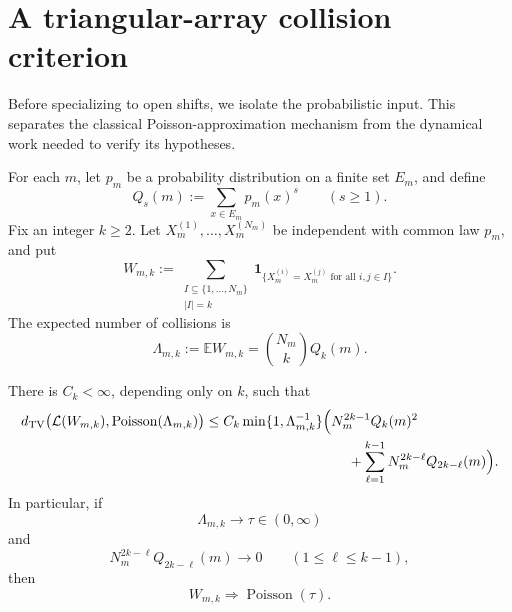 \section{A triangular-array collision criterion}
\label{sec:triangular-array}

Before specializing to open shifts, we isolate the probabilistic input.
This separates the classical Poisson-approximation mechanism from the
dynamical work needed to verify its hypotheses.

For each \(m\), let \(p_m\) be a probability distribution on a finite
set \(E_m\), and define
\[
  Q_s(m):=\sum_{x\in E_m}p_m(x)^s
  \qquad(s\geq1).
\]
Fix an integer \(k\geq2\).  Let
\(X_m^{(1)},\ldots,X_m^{(N_m)}\) be independent with common law \(p_m\),
and put
\[
  W_{m,k}
  :=\sum_{\substack{I\subseteq\{1,\ldots,N_m\}\\|I|=k}}
     \mathbf1_{\{X_m^{(i)}=X_m^{(j)}\text{ for all }i,j\in I\}}.
\]
The expected number of collisions is
\[
  \Lambda_{m,k}:=\mathbb EW_{m,k}
  =\binom{N_m}{k}Q_k(m).
\]

\begin{theorem}
\label{thm:abstract-collision-criterion}
There is \(C_k<\infty\), depending only on \(k\), such that
\begin{align}
 d_{\rm TV}\bigl(\mathcal L(W_{m,k}),
   \operatorname{Poisson}(\Lambda_{m,k})\bigr)
 &\leq C_k\min\{1,\Lambda_{m,k}^{-1}\}
 \Bigl(
 N_m^{2k-1}Q_k(m)^2 \notag\\
 &\hspace{36mm}+
 \sum_{\ell=1}^{k-1}N_m^{2k-\ell}Q_{2k-\ell}(m)
 \Bigr).
 \label{eq:abstract-tv-bound}
\end{align}
In particular, if
\[
  \Lambda_{m,k}\longrightarrow\tau\in(0,\infty)
\]
and
\begin{equation}
  N_m^{2k-\ell}Q_{2k-\ell}(m)\longrightarrow0
  \qquad(1\leq\ell\leq k-1),
  \label{eq:abstract-overlap-condition}
\end{equation}
then
\[
  W_{m,k}\Rightarrow\operatorname{Poisson}(\tau).
\]
\end{theorem}

